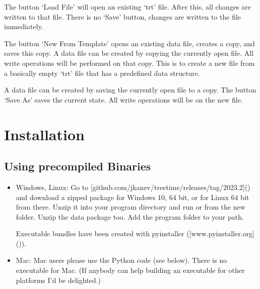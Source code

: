 \documentclass[letterpaper,10pt,english]{sphinxmanual}
\begin{document}
\sphinxAtStartPar
The button ‘Load File’ will open an existing ‘trt’ file. After this, all changes are written to that file. There is no ‘Save’ button, changes are written to the file immediately.

\sphinxAtStartPar
The button ‘New From Template’ opens an existing data file, creates a copy, and saves this copy. A data file can be created by copying the currently open file. All write operations will be performed on that copy. This is to create a new file from a basically empty ‘trt’ file that has a pre\sphinxhyphen{}defined data structure.

\sphinxAtStartPar
A data file can be created by saving the currently open file to a copy. The button ‘Save As’ saves the current state. All write operations will be on the new file.


\section{Installation}
\label{\detokenize{introduction:installation}}

\subsection{Using pre\sphinxhyphen{}compiled Binaries}
\label{\detokenize{introduction:using-pre-compiled-binaries}}\begin{itemize}
\item {} 
\sphinxAtStartPar
Windows, Linux: Go to {[}github.com/jkanev/treetime/releases/tag/2023.2{]}() and download a zipped package for Windows 10, 64 bit, or for Linux 64 bit from there. Unzip it into your program directory and run  or  from the new folder. Unzip the data package too. Add the program folder to your path.

\sphinxAtStartPar
Executable bundles have been created with pyinstaller ({[}www.pyinstaller.org{]}()).

\item {} 
\sphinxAtStartPar
Mac: Mac users please use the Python code (see below). There is no executable for Mac.
(If anybody can help building an executable for other platforms I’d be delighted.)

\end{itemize}
\end{document}
